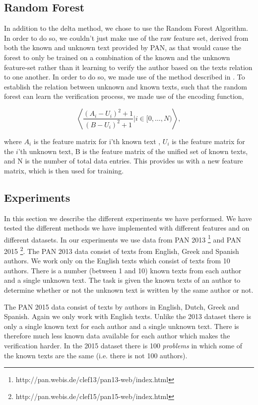 \subsection{Random Forest}
In addition to the delta method, we chose to use the Random Forest Algorithm.
In order to do so, we couldn't just make use of the raw feature set, derived
from both the known and unknown text provided by PAN, as that would cause
the forest to only be trained on a combination of the known and the unknown
feature-set rather than it learning to verify the author based on the texts
relation to one another. In order to do so, we made use of the method described
in \cite{pacheco2015}. To establish the relation between unknown and known
texts, such that the random forest can learn the verification process, we made
use of the encoding function,

\begin{equation}
    \left\langle
        \dfrac{(A_i-U_i)^2+1}{(B-U_i)^2+1}|i \in [0,\dots, N)
    \right\rangle,
\end{equation}

where $A_i$ is the feature matrix for i'th known text , $U_i$ is the feature
matrix for the $i$'th unknown text, B is the feature matrix of the unified set
of known texts, and N is the number of total data entries. This provides us with
a new feature matrix, which is then used for training.

\subsection{Experiments}
In this section we describe the different experiments we have performed.
We have tested the different methods we have implemented with different
features and on different datasets. In our experiments we use data from PAN
2013 \footnote{http://pan.webis.de/clef13/pan13-web/index.html} and PAN 2015
\footnote{http://pan.webis.de/clef15/pan15-web/index.html}. The PAN 2013 data
consist of texts from English, Greek and Spanish authors. We work only on the
English texts which consist of texts from 10 authors. There is a number (between
1 and 10) known texts from each author and a single unknown text. The task is
given the known texts of an author to determine whether or not the unknown text
is written by the same author or not.

The PAN 2015 data consist of texts by authors in English, Dutch, Greek and
Spanish. Again we only work with English texts. Unlike the 2013 dataset there is
only a single known text for each author and a single unknown text. There is
therefore much less known data available for each author which makes the
verification harder. In the 2015 dataset there is 100 \textit{problems} in which
some of the known texts are the same (i.e. there is not 100 authors).

